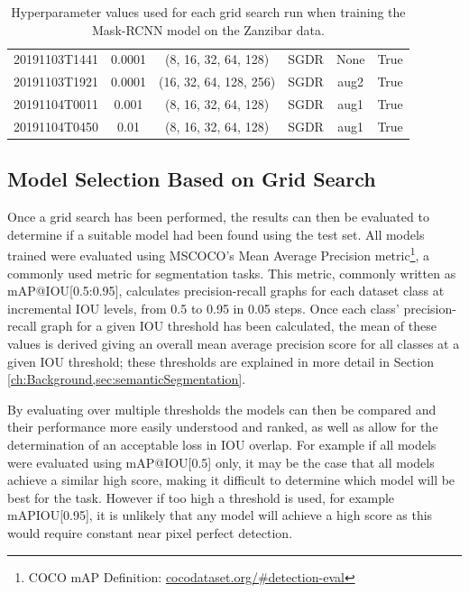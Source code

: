 \begin{table}[!ht]
\begin{adjustbox}{width=\columnwidth, center}
\begin{tabular}{cccccc}
			20191103T1441 &       0.0001 &     (8, 16, 32, 64, 128) &      SGDR &                  None &                  True \\
			20191103T1921 &       0.0001 &   (16, 32, 64, 128, 256) &      SGDR &                  aug2 &                  True \\
			20191104T0011 &        0.001 &     (8, 16, 32, 64, 128) &      SGDR &                  aug1 &                  True \\
			20191104T0450 &         0.01 &     (8, 16, 32, 64, 128) &      SGDR &                  aug1 &                  True \\
			\bottomrule
		\end{tabular}
	\end{adjustbox}
	\caption{Hyperparameter values used for each grid search run when training the Mask-RCNN model on the Zanzibar data.}\label{tab:MaskRCNNHyperparamTuningGridSearch}
\end{table}

\subsection{Model Selection Based on Grid Search}\label{ch:cetDet,sec:ModelSelection,sub:ModelSelectionBasedOnGridSearch}

Once a grid search has been performed, the results can then be evaluated to determine if a suitable model had been found using the test set. All models trained were evaluated using MSCOCO's Mean Average Precision metric\footnote{COCO mAP Definition: \href{https://cocodataset.org/\#detection-eval}{cocodataset.org/\#detection-eval}}, a commonly used metric for segmentation tasks. This metric, commonly written as mAP@IOU[0.5:0.95], calculates precision-recall graphs for each dataset class at incremental IOU levels, from 0.5 to 0.95 in 0.05 steps. Once each class' precision-recall graph for a given IOU threshold has been calculated, the mean of these values is derived giving an overall mean average precision score for all classes at a given IOU threshold; these thresholds are explained in more detail in Section \ref{ch:Background,sec:semanticSegmentation}.

By evaluating over multiple thresholds the models can then be compared and their performance more easily understood and ranked, as well as allow for the determination of an acceptable loss in IOU overlap. For example if all models were evaluated using mAP@IOU[0.5] only, it may be the case that all models achieve a similar high score, making it difficult to determine which model will be best for the task. However if too high a threshold is used, for example mAPIOU[0.95], it is unlikely that any model will achieve a high score as this would require constant near pixel perfect detection. 

